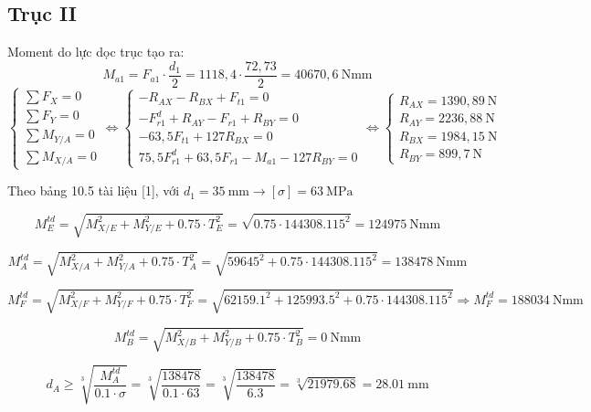 \subsection{Trục II}
Moment do lực dọc trục tạo ra:
\[
    M_{a1} = F_{a1} \cdot \frac{d_1}{2} 
           = 1118{,}4 \cdot \frac{72{,}73}{2} 
           = 40670{,}6\ \text{Nmm}
\]
\[
    \left\{
    \begin{array}{l}
        \sum F_X = 0 \\
        \sum F_Y = 0 \\
        \sum M_{Y/A} = 0 \\
        \sum M_{X/A} = 0
    \end{array}
    \right.
    \Leftrightarrow
    \left\{
    \begin{array}{l}
        -R_{AX} - R_{BX} + F_{t1} = 0 \\
        -F_{r1}^d + R_{AY} - F_{r1} + R_{BY} = 0 \\
        -63{,}5 F_{t1} + 127 R_{BX} = 0 \\
        75{,}5 F_{r1}^d + 63{,}5 F_{r1} - M_{a1} - 127 R_{BY} = 0
    \end{array}
    \right.
    \Leftrightarrow
    \left\{
    \begin{array}{l}
        R_{AX} = 1390{,}89\ \text{N} \\
        R_{AY} = 2236{,}88\ \text{N} \\
        R_{BX} = 1984{,}15\ \text{N} \\
        R_{BY} = 899{,}7\ \text{N}
    \end{array}
    \right.
\]

Theo bảng 10.5 tài liệu [1], với $d_1 = 35\ \text{mm} \rightarrow [\sigma] = 63\ \text{MPa}$

\[
    M_E^{td} 
    = \sqrt{M_{X/E}^2 + M_{Y/E}^2 + 0.75 \cdot T_E^2} 
    = \sqrt{0.75 \cdot 144308.115^2} 
    = 124975\ \text{Nmm}
\]

\[
    M_A^{td} 
    = \sqrt{M_{X/A}^2 + M_{Y/A}^2 + 0.75 \cdot T_A^2} 
    = \sqrt{59645^2 + 0.75 \cdot 144308.115^2} 
    = 138478\ \text{Nmm}
\]

\[
    M_F^{td} 
    = \sqrt{M_{X/F}^2 + M_{Y/F}^2 + 0.75 \cdot T_F^2} 
    = \sqrt{62159.1^2 + 125993.5^2 + 0.75 \cdot 144308.115^2}
    \Rightarrow M_F^{td} = 188034\ \text{Nmm}
\]

\[
    M_B^{td} 
    = \sqrt{M_{X/B}^2 + M_{Y/B}^2 + 0.75 \cdot T_B^2} 
    = 0\ \text{Nmm}
\]

\[
    d_A \ge \sqrt[3]{\frac{M_A^{td}}{0.1 \cdot \sigma}} 
        = \sqrt[3]{\frac{138478}{0.1 \cdot 63}} 
        = \sqrt[3]{\frac{138478}{6.3}} 
        = \sqrt[3]{21979.68} 
        = 28.01\ \text{mm}
\]

